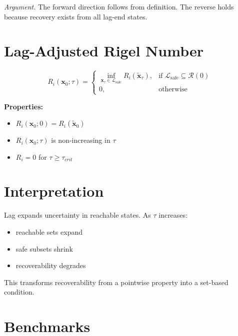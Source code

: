 \documentclass[letterpaper, 10 pt, conference]{ieeeconf}
\begin{document}
\textit{Argument.}
The forward direction follows from definition. The reverse holds because recovery exists from all lag-end states.

\section{Lag-Adjusted Rigel Number}

\begin{definition}
\begin{equation}
R_i(\mathbf{x}_0;\tau) =
\begin{cases}
\inf_{\mathbf{x}_\tau \in \mathcal{L}_{\text{safe}}} R_i(\tilde{\mathbf{x}}_\tau),
& \text{if } \mathcal{L}_{\text{safe}} \subseteq \mathcal{R}(0) \\
0, & \text{otherwise}
\end{cases}
\end{equation}
\end{definition}

\textbf{Properties:}
\begin{itemize}
\item $R_i(\mathbf{x}_0;0) = R_i(\tilde{\mathbf{x}}_0)$
\item $R_i(\mathbf{x}_0;\tau)$ is non-increasing in $\tau$
\item $R_i = 0$ for $\tau \ge \tau_{crit}$
\end{itemize}

\section{Interpretation}

Lag expands uncertainty in reachable states. As $\tau$ increases:
\begin{itemize}
\item reachable sets expand
\item safe subsets shrink
\item recoverability degrades
\end{itemize}

This transforms recoverability from a pointwise property into a set-based condition.

\section{Benchmarks}
\end{document}
